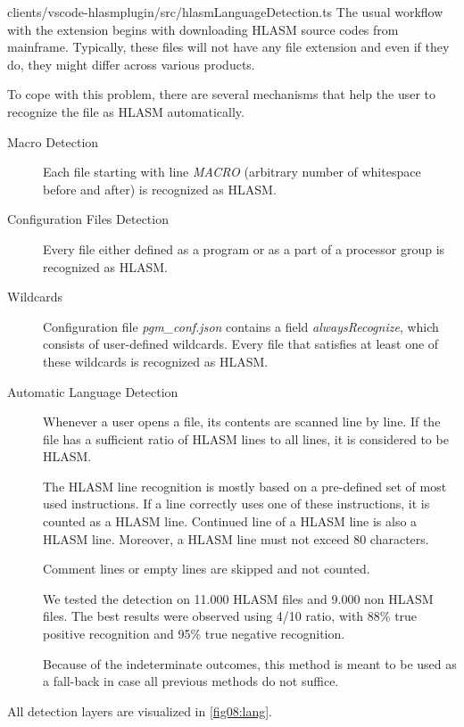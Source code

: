 {clients/vscode-hlasmplugin/src/hlasmLanguageDetection.ts}
\label{section:wildcard}
The usual workflow with the extension begins with downloading HLASM source codes from mainframe. Typically, these files will not have any file extension and even if they do, they might differ across various products.

To cope with this problem, there are several mechanisms that help the user to recognize the file as HLASM automatically.

\begin{description}
	\item[Macro Detection] Each file starting with line \emph{MACRO} (arbitrary number of whitespace before and after) is recognized as HLASM.
	\item[Configuration Files Detection] Every file either defined as a program or as a part of a processor group is recognized as HLASM.
	\item[Wildcards] Configuration file \emph{pgm\_conf.json} contains a field \emph{alwaysRecognize}, which consists of user-defined wildcards. Every file that satisfies at least one of these wildcards is recognized as HLASM.
	\item[Automatic Language Detection] Whenever a user opens a file, its contents are scanned line by line. If the file has a sufficient ratio of HLASM lines to all lines, it is considered to be HLASM.
	
	The HLASM line recognition is mostly based on a pre-defined set of most used instructions. If a line correctly uses one of these instructions, it is counted as a HLASM line. Continued line of a HLASM line is also a HLASM line.
	Moreover, a HLASM line must not exceed 80 characters.
	
	Comment lines or empty lines are skipped and not counted. 
	
	We tested the detection on 11.000 HLASM files and 9.000 non HLASM files. The best results were observed using 4/10 ratio, with 88\% true positive recognition and 95\% true negative recognition. 
	
	Because of the indeterminate outcomes, this method is meant to be used as a fall-back in case all previous methods do not suffice.
\end{description}

All detection layers are visualized in \cref{fig08:lang}.

